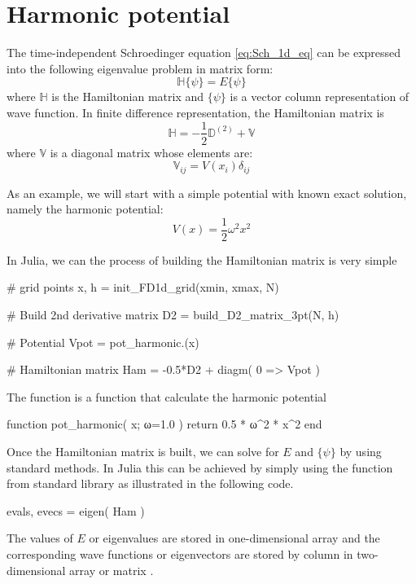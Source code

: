 \section{Harmonic potential}

The time-independent Schroedinger equation \eqref{eq:Sch_1d_eq} can be expressed into
the following eigenvalue problem in matrix form:
\begin{equation}
\mathbb{H}\{ \psi \} = E \{ \psi \}
\end{equation}
where $\mathbb{H}$ is the Hamiltonian matrix and $\{ \psi \}$ is a vector
column representation of wave function.
In finite difference representation, the Hamiltonian matrix is
\begin{equation}
\mathbb{H} = -\frac{1}{2}\mathbb{D}^{(2)} + \mathbb{V}
\end{equation}
where $\mathbb{V}$ is a diagonal matrix whose elements are:
\begin{equation}
\mathbb{V}_{ij} = V(x_{i})\delta_{ij}
\end{equation}

As an example, we will start with a simple potential with known exact solution,
namely the harmonic potential:
\begin{equation}
V(x) = \frac{1}{2}\omega^2 x^2
\end{equation}

In Julia, we can the process of building the Hamiltonian matrix is very simple
\begin{juliacode}
# grid points
x, h = init_FD1d_grid(xmin, xmax, N)

# Build 2nd derivative matrix
D2 = build_D2_matrix_3pt(N, h)

# Potential
Vpot = pot_harmonic.(x)

# Hamiltonian matrix
Ham = -0.5*D2 + diagm( 0 => Vpot )
\end{juliacode}

The function  is a function that calculate the harmonic potential
\begin{juliacode}
function pot_harmonic( x; ω=1.0 )
    return 0.5 * ω^2 * x^2
end
\end{juliacode}

Once the Hamiltonian matrix is built, we can solve for $E$ and $\{\psi\}$ by using standard
methods. In Julia this can be achieved by simply using the  function
from  standard library as illustrated in the following code.
\begin{juliacode}
evals, evecs = eigen( Ham )
\end{juliacode}
The values of $E$ or eigenvalues are stored in one-dimensional array 
and the corresponding wave functions or eigenvectors are stored by column in two-dimensional
array or matrix .

